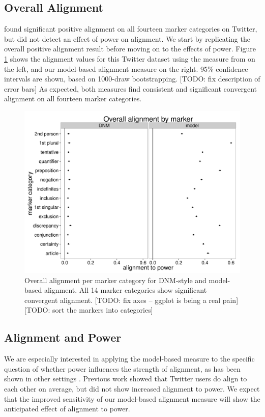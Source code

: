 \documentclass{acm_proc_article-sp}
\begin{document}
\subsection{Overall Alignment}
\cite{DNMGamonDumais2011} found significant positive alignment on all fourteen marker categories on Twitter, but did not detect an effect of power on alignment.  We start by replicating the overall positive alignment result before moving on to the effects of power.  Figure \ref{fig:overall-alignment} shows the alignment values for this Twitter dataset using the measure from \cite{DNMGamonDumais2011} on the left, and our model-based alignment measure on the right.  95\% confidence intervals are shown, based on 1000-draw bootstrapping. [TODO: fix description of error bars] As expected, both measures find consistent and significant convergent alignment on all fourteen marker categories.  

\begin{figure}[t]
\centering
\includegraphics[width=.9\columnwidth]{graphics/www2016_alignmentdnmour_uniform.pdf}
\caption{Overall alignment per marker category for DNM-style and model-based alignment. All 14 marker categories show significant convergent alignment. [TODO: fix axes -- ggplot is being a real pain] [TODO: sort the markers into categories]}\label{fig:overall-alignment}
\end{figure}


\subsection{Alignment and Power}
We are especially interested in applying the model-based measure to the specific question of whether power influences the strength of alignment, as has been shown in other settings \cite{DNMEtAl2012,NobleFernandez2015}. Previous work \cite{DNMGamonDumais2011} showed that Twitter users do align to each other on average, but did not show increased alignment to power.  We expect that the improved sensitivity of our model-based alignment measure will show the anticipated effect of alignment to power.
\end{document}
